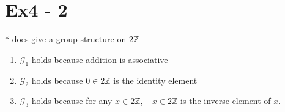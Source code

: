 \section*{Ex4 - 2}
$ * $ does give a group structure on $ 2\mathbb{Z} $
\begin{enumerate}
    \item {$ \mathscr{G}_1 $ holds because addition is associative}
    \item {$ \mathscr{G}_2 $ holds because $ 0 \in 2\mathbb{Z} $ is the identity element}
    \item {$ \mathscr{G}_3 $ holds because for any $ x \in 2\mathbb{Z} $, $ -x \in 2\mathbb{Z} $ is the inverse element of $ x $.}
\end{enumerate}